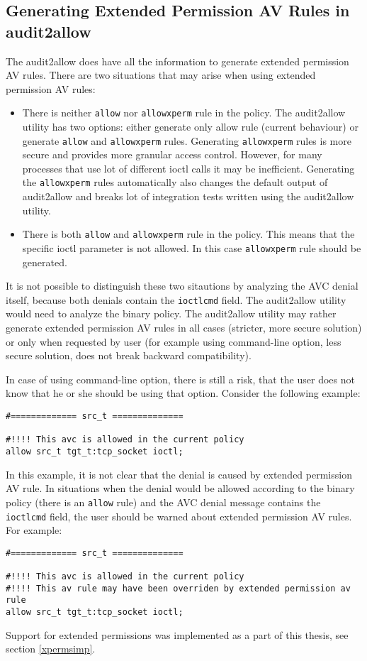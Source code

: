 \subsection{Generating Extended Permission AV Rules in audit2allow}
The audit2allow does have all the information to generate extended permission AV
rules. There are two situations that may arise when using extended permission AV
rules:
\begin{itemize}
    \item There is neither \texttt{allow} nor \texttt{allowxperm} rule in the
        policy. The audit2allow utility has two options: either generate only
        allow rule (current behaviour) or generate \texttt{allow} and
        \texttt{allowxperm} rules. Generating \texttt{allowxperm} rules is more
        secure and provides more granular access control. However, for many
        processes that use lot of different ioctl calls it may be inefficient.
        Generating the \texttt{allowxperm} rules automatically also changes the
        default output of audit2allow and breaks lot of integration tests
        written using the audit2allow utility.
    \item There is both \texttt{allow} and \texttt{allowxperm} rule in the
        policy. This means that the specific ioctl parameter is not allowed. In
        this case \texttt{allowxperm} rule should be generated.
\end{itemize}

It is not possible to distinguish these two sitautions by analyzing the AVC
denial itself, because both denials contain the \texttt{ioctlcmd} field. The
audit2allow utility would need to analyze the binary policy. The audit2allow
utility may rather generate extended permission AV rules in all cases (stricter,
more secure solution) or only when requested by user (for example using
command-line option, less secure solution, does not break backward
compatibility).

In case of using command-line option, there is still a risk, that the user does
not know that he or she should be using that option. Consider the following
example:
\begin{lstlisting}
#============= src_t ==============

#!!!! This avc is allowed in the current policy
allow src_t tgt_t:tcp_socket ioctl;
\end{lstlisting}
In this example, it is not clear that the denial is caused by extended
permission AV rule. In situations when the denial would be allowed according to
the binary policy (there is an \texttt{allow} rule) and the AVC denial message
contains the \texttt{ioctlcmd} field, the user should be warned about extended
permission AV rules. For example:
\begin{lstlisting}
#============= src_t ==============

#!!!! This avc is allowed in the current policy
#!!!! This av rule may have been overriden by extended permission av rule
allow src_t tgt_t:tcp_socket ioctl;
\end{lstlisting}
Support for extended permissions was implemented as a part of this thesis, see
section \ref{xpermsimp}.

